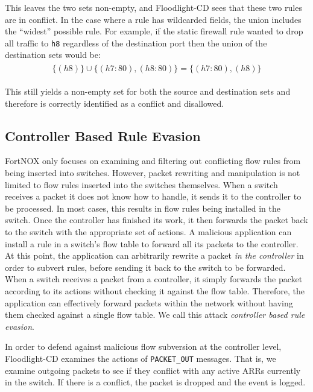 This leaves the two sets non-empty, and Floodlight-CD sees that these two rules are in conflict.
In the case where a rule has wildcarded fields, the union includes the ``widest'' possible rule.
For example, if the static firewall rule wanted to drop all traffic to \texttt{h8} regardless of the destination port then the union of the destination sets would be:
\begin{align}
\begin{aligned}
\{(h8)\} \cup \{(h7:80),(h8:80)\} =  \{(h7:80),(h8)\} \nonumber
\end{aligned}
\end{align}

This still yields a non-empty set for both the source and destination sets and therefore is correctly identified as a conflict and disallowed.

\subsection{Controller Based Rule Evasion}
\label{subsec:cbre}

FortNOX only focuses on examining and filtering out conflicting flow rules from being inserted into switches. 
However, packet rewriting and manipulation is not limited to flow rules inserted into the switches themselves. 
When a switch receives a packet it does not know how to handle, it sends it to the controller to be processed.
In most cases, this results in flow rules being installed in the switch.
Once the controller has finished its work, it then forwards the packet back to the switch with the appropriate set of actions.
A malicious application can install a rule in a switch's flow table to forward all its packets to the controller.
At this point, the application can arbitrarily rewrite a packet \emph{in the controller} in order to subvert rules, before sending it back to the switch to be forwarded. 
When a switch receives a packet from a controller, it simply forwards the packet according to its actions without checking it against the flow table.
Therefore, the application can effectively forward packets within the network without having them checked against a single flow table.
We call this attack \emph{controller based rule evasion}.

In order to defend against malicious flow subversion at the controller level, Floodlight-CD examines the actions of \texttt{PACKET\_OUT} messages. 
That is, we examine outgoing packets to see if they conflict with any active ARRs currently in the switch. 
If there is a conflict, the packet is dropped and the event is logged.


